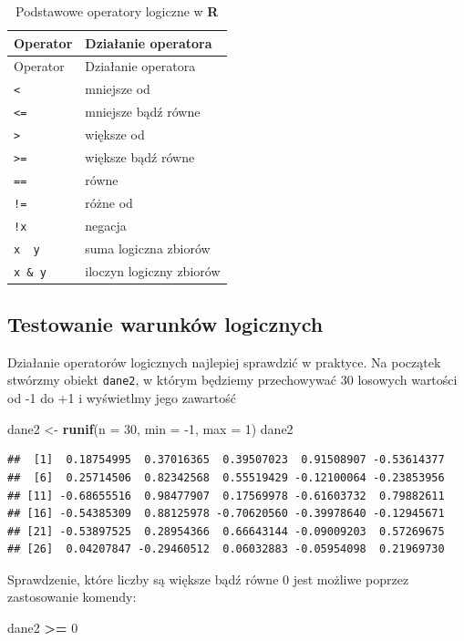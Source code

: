 \documentclass[]{book}
\newenvironment{Shaded}{\begin{snugshade}}{\end{snugshade}}
\newcommand{\KeywordTok}[1]{\textcolor[rgb]{0.13,0.29,0.53}{\textbf{#1}}}
\newcommand{\DataTypeTok}[1]{\textcolor[rgb]{0.13,0.29,0.53}{#1}}
\newcommand{\DecValTok}[1]{\textcolor[rgb]{0.00,0.00,0.81}{#1}}
\newcommand{\StringTok}[1]{\textcolor[rgb]{0.31,0.60,0.02}{#1}}
\newcommand{\OperatorTok}[1]{\textcolor[rgb]{0.81,0.36,0.00}{\textbf{#1}}}
\newcommand{\NormalTok}[1]{#1}
\theoremstyle{definition}
\theoremstyle{definition}
\theoremstyle{definition}
\theoremstyle{remark}
\begin{document}
\begin{longtable}[]{@{}ll@{}}
\caption{Podstawowe operatory logiczne w \textbf{R}}\tabularnewline
\toprule
Operator & Działanie operatora\tabularnewline
\midrule
\endfirsthead
\toprule
Operator & Działanie operatora\tabularnewline
\midrule
\endhead
\texttt{\textless{}} & mniejsze od\tabularnewline
\texttt{\textless{}=} & mniejsze bądź równe\tabularnewline
\texttt{\textgreater{}} & większe od\tabularnewline
\texttt{\textgreater{}=} & większe bądź równe\tabularnewline
\texttt{==} & równe\tabularnewline
\texttt{!=} & różne od\tabularnewline
\texttt{!x} & negacja\tabularnewline
\texttt{x\ \textbar{}\ y} & suma logiczna zbiorów\tabularnewline
\texttt{x\ \&\ y} & iloczyn logiczny zbiorów\tabularnewline
\bottomrule
\end{longtable}

\subsection{Testowanie warunków
logicznych}\label{testowanie-warunkow-logicznych}

Działanie operatorów logicznych najlepiej sprawdzić w praktyce. Na
początek stwórzmy obiekt \texttt{dane2}, w którym będziemy przechowywać
30 losowych wartości od -1 do +1 i wyświetlmy jego zawartość

\begin{Shaded}
\begin{Highlighting}[]
\NormalTok{dane2 <-}\StringTok{ }\KeywordTok{runif}\NormalTok{(}\DataTypeTok{n =} \DecValTok{30}\NormalTok{, }\DataTypeTok{min =} \DecValTok{-1}\NormalTok{, }\DataTypeTok{max =} \DecValTok{1}\NormalTok{)}
\NormalTok{dane2}
\end{Highlighting}
\end{Shaded}

\begin{verbatim}
##  [1]  0.18754995  0.37016365  0.39507023  0.91508907 -0.53614377
##  [6]  0.25714506  0.82342568  0.55519429 -0.12100064 -0.23853956
## [11] -0.68655516  0.98477907  0.17569978 -0.61603732  0.79882611
## [16] -0.54385309  0.88125978 -0.70620560 -0.39978640 -0.12945671
## [21] -0.53897525  0.28954366  0.66643144 -0.09009203  0.57269675
## [26]  0.04207847 -0.29460512  0.06032883 -0.05954098  0.21969730
\end{verbatim}

Sprawdzenie, które liczby są większe bądź równe 0 jest możliwe poprzez
zastosowanie komendy:

\begin{Shaded}
\begin{Highlighting}[]
\NormalTok{dane2 }\OperatorTok{>=}\StringTok{ }\DecValTok{0}
\end{Highlighting}
\end{Shaded}
\end{document}
